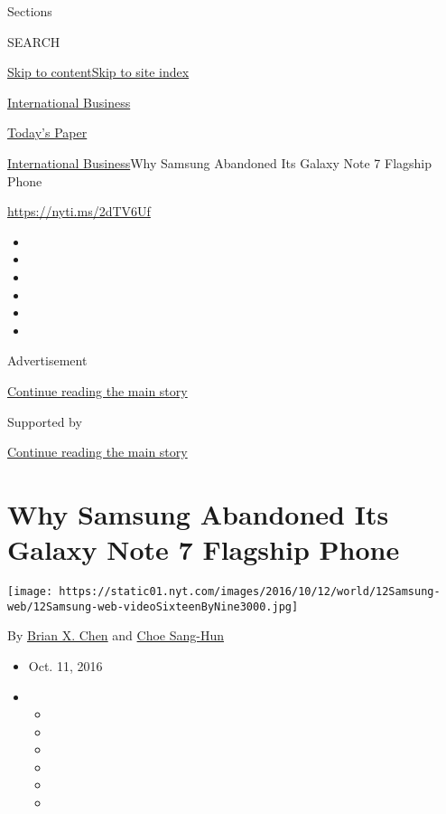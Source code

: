 Sections

SEARCH

\protect\hyperlink{site-content}{Skip to
content}\protect\hyperlink{site-index}{Skip to site index}

\href{https://www.nytimes.com/section/business}{International Business}

\href{https://myaccount.nytimes.com/auth/login?response_type=cookie\&client_id=vi}{}

\href{https://www.nytimes.com/section/todayspaper}{Today's Paper}

\href{/section/business}{International Business}\textbar{}Why Samsung
Abandoned Its Galaxy Note 7 Flagship Phone

\url{https://nyti.ms/2dTV6Uf}

\begin{itemize}
\item
\item
\item
\item
\item
\item
\end{itemize}

Advertisement

\protect\hyperlink{after-top}{Continue reading the main story}

Supported by

\protect\hyperlink{after-sponsor}{Continue reading the main story}

\hypertarget{why-samsung-abandoned-its-galaxy-note-7-flagship-phone}{%
\section{Why Samsung Abandoned Its Galaxy Note 7 Flagship
Phone}\label{why-samsung-abandoned-its-galaxy-note-7-flagship-phone}}

\texttt{[image: https://static01.nyt.com/images/2016/10/12/world/12Samsung-web/12Samsung-web-videoSixteenByNine3000.jpg]}

By \href{http://www.nytimes.com/by/brian-x-chen}{Brian X. Chen} and
\href{http://www.nytimes.com/by/choe-sang-hun}{Choe Sang-Hun}

\begin{itemize}
\item
  Oct. 11, 2016
\item
  \begin{itemize}
  \item
  \item
  \item
  \item
  \item
  \item
  \end{itemize}
\end{itemize}


